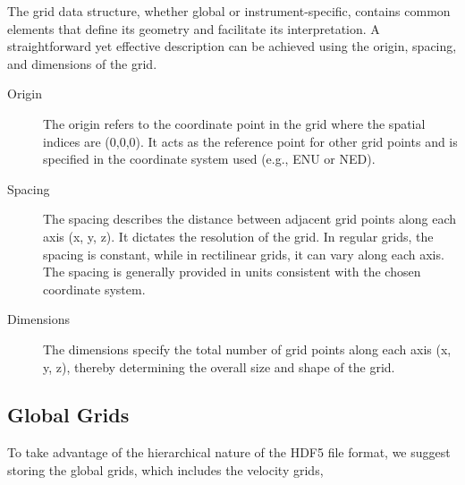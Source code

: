 The grid data structure, whether global or instrument-specific, contains common elements that define its geometry and facilitate its interpretation. A straightforward yet effective description can be achieved using the origin, spacing, and dimensions of the grid.

\begin{description}
    \item[Origin] The origin refers to the coordinate point in the grid where the spatial indices are (0,0,0). It acts as the reference point for other grid points and is specified in the coordinate system used (e.g., ENU or NED).
    
    \item[Spacing] The spacing describes the distance between adjacent grid points along each axis (x, y, z). It dictates the resolution of the grid. In regular grids, the spacing is constant, while in rectilinear grids, it can vary along each axis. The spacing is generally provided in units consistent with the chosen coordinate system.
    
    \item[Dimensions] The dimensions specify the total number of grid points along each axis (x, y, z), thereby determining the overall size and shape of the grid.
\end{description}


\subsection{Global Grids}

To take advantage of the hierarchical nature of the HDF5 file format, we suggest storing the global grids, which includes the velocity grids, 

